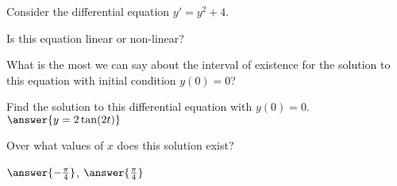 \documentclass{ximera}
\begin{document}
\begin{exercise}
    Consider the differential equation $y' = y^2 + 4$. 

    Is this equation linear or non-linear?
    \begin{multipleChoice}
    \end{multipleChoice}
    \begin{problem}
        What is the most we can say about the interval of existence for the solution to this equation with initial condition $y(0) = 0$?
        
        \begin{multipleChoice}
        \end{multipleChoice}
        \begin{problem}
            Find the solution to this differential equation with $y(0) = 0$. $\answer{y = 2\tan(2t)}$
            \begin{problem}
                Over what values of $x$ does this solution exist?
                
                \wordChoice{\choice[correct]{(},\choice{[}}$\answer{-\frac{\pi}{4}}$, $\answer{\frac{\pi}{4}}$\wordChoice{\choice[correct]{)},\choice{]}}
            \end{problem}
        \end{problem}
    \end{problem}
        
\end{exercise}
\end{document}

